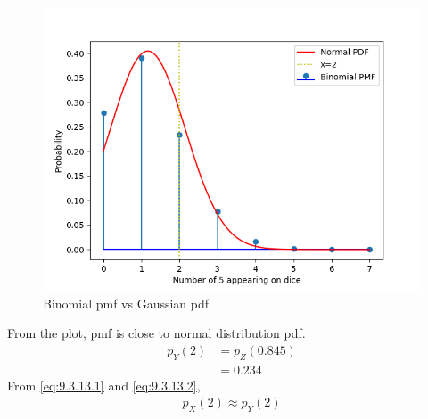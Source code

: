 \documentclass[journal,12pt,twocolumn]{IEEEtran}
\theoremstyle{remark}
\begin{document}
\begin{figure}[!ht]
\centering
\includegraphics[width=\columnwidth]{./figs/figure.png}
\caption{Binomial pmf vs Gaussian pdf }
\label{fig:9.3.13}
\end{figure}
From the plot, pmf is close to normal distribution pdf.
\begin{align}
	p_Y(2)&=p_Z(0.845)\\
&=0.234\label{eq:9.3.13.2}
\end{align}
From \eqref{eq:9.3.13.1} and \eqref{eq:9.3.13.2},
\begin{align}
p_X(2)\approx p_Y(2)
\end{align}
\end{document}

